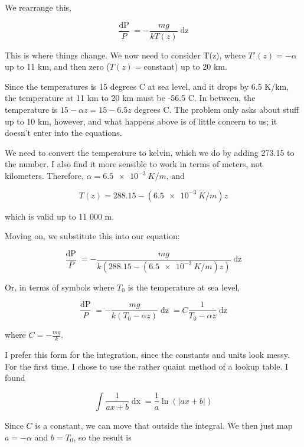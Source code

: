 \documentclass[8.01x]{subfiles}
\begin{document}
We rearrange this,

\begin{equation}
\frac{\mathop{dP}}{P} = - \frac{mg}{k T(z)} \mathop{dz}
\end{equation}

This is where things change. We now need to consider T(z), where $T'(z) = -\alpha$ up to 11 km, and then zero ($T(z) = \text{constant}$) up to 20 km.

Since the temperatures is 15 degrees C at sea level, and it drops by 6.5 K/km, the temperature at 11 km to 20 km must be -56.5 C. In between, the temperature is $15 - \alpha z = 15 - 6.5 z$ degrees C. The problem only asks about stuff up to 10 km, however, and what happens above is of little concern to us; it doesn't enter into the equations.

We need to convert the temperature to kelvin, which we do by adding 273.15 to the number. I also find it more sensible to work in terms of meters, not kilometers. Therefore, $\alpha = \SI{6.5e-3}{K/m}$, and

\begin{equation}
T(z) = 288.15 - (\SI{6.5e-3}{K/m}) z
\end{equation}

which is valid up to 11 000 m.

Moving on, we substitute this into our equation:

\begin{equation}
\frac{\mathop{dP}}{P} = - \frac{mg}{k (288.15 - (\SI{6.5e-3}{K/m}) z)} \mathop{dz}
\end{equation}

Or, in terms of symbols where $T_0$ is the temperature at sea level,

\begin{equation}
\frac{\mathop{dP}}{P} = - \frac{mg}{k (T_0 - \alpha z)} \mathop{dz} = C \frac{1}{T_0 - \alpha z} \mathop{dz}
\end{equation}

where $C = -\frac{m g}{k}$.

I prefer this form for the integration, since the constants and units look messy. For the first time, I chose to use the rather quaint method of a lookup table. I found

\begin{equation}
\int \frac{1}{a x + b} \mathop{dx} = \frac{1}{a} \ln (|ax + b|)
\end{equation}

Since $C$ is a constant, we can move that outside the integral. We then just map $a = -\alpha$ and $b = T_0$, so the result is
\end{document}
